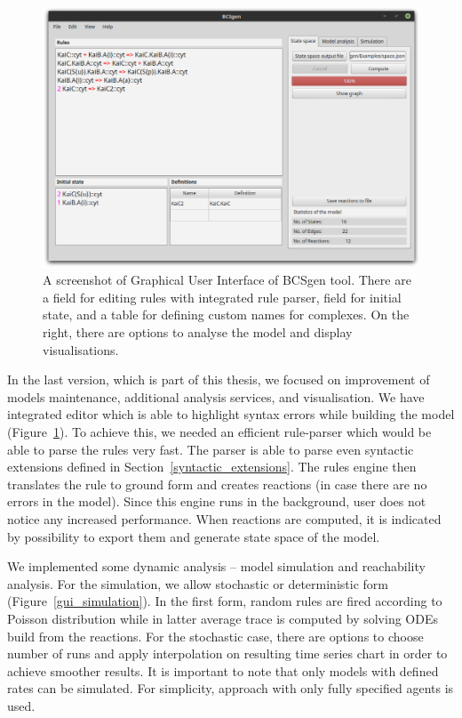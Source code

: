 \documentclass[12pt, twoside]{fithesis2} %
\begin{document}
\begin{figure}[!h]
\begin{center}
\includegraphics[scale=0.35]{pics/BCSgen_gui}
\caption{A screenshot of Graphical User Interface of BCSgen tool. There are a field for editing rules with integrated rule parser, field for initial state, and a table for defining custom names for complexes. On the right, there are options to analyse the model and display visualisations.}\label{gui_example}
\end{center}
\end{figure}

In the last version, which is part of this thesis, we focused on improvement of models maintenance, additional analysis services, and visualisation. We have integrated editor which is able to highlight syntax errors while building the model (Figure~\ref{gui_example}). To achieve this, we needed an efficient rule-parser which would be able to parse the rules very fast. The parser is able to parse even syntactic extensions defined in Section~\ref{syntactic_extensions}. The rules engine then translates the rule to ground form and creates reactions (in case there are no errors in the model). Since this engine runs in the background, user does not notice any increased performance. When reactions are computed, it is indicated by possibility to export them and generate state space of the model.

We implemented some dynamic analysis -- model simulation and reachability analysis. For the simulation, we allow stochastic or deterministic form (Figure~\ref{gui_simulation}). In the first form, random rules are fired according to Poisson distribution while in latter average trace is computed by solving ODEs build from the reactions. For the stochastic case, there are options to choose number of runs and apply interpolation on resulting time series chart in order to achieve smoother results. It is important to note that only models with defined rates can be simulated. For simplicity, approach with only fully specified agents is used.
\end{document}
